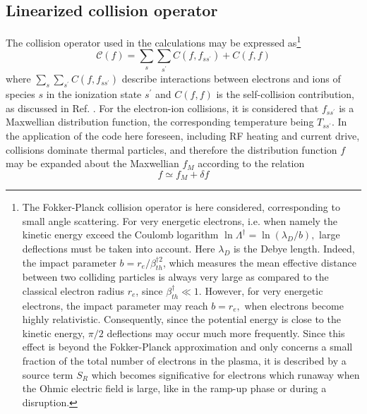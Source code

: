 

\label{Collisions}

\subsection{Linearized collision operator}

The collision operator used in the calculations may be expressed as\footnote{%
The Fokker-Planck collision operator is here considered, corresponding to
small angle scattering. For very energetic electrons, i.e. when namely the
kinetic energy exceed the Coulomb logarithm $\ln \Lambda ^{\dag }=\ln \left(
\lambda _{D}/b\right) ,$ large deflections must be taken into account. Here $%
\lambda _{D}$ is the Debye length. Indeed, the impact parameter $%
b=r_{e}/\beta _{th}^{\dag 2}$, which measures the mean effective distance
between two colliding particles is always very large as compared to the
classical electron radius $r_{e}$, since $\beta _{th}^{\dag }\ll 1.$
However, for very energetic electrons, the impact parameter may reach $%
b=r_{e},$ when electrons become highly relativistic. Consequently, since the
potential energy is close to the kinetic energy, $\pi /2$ deflections may
occur much more frequently. Since this effect is beyond the Fokker-Planck
approximation and only concerns a small fraction of the total number of
electrons in the plasma, it is described by a source term $S_{R}$ which
becomes significative for electrons which runaway when the Ohmic electric
field is large, like in the ramp-up phase or during a disruption.}
\begin{equation}
\mathcal{C}\left( f\right) =\sum_{s}\sum_{s^{\prime }}C\left(
f,f_{ss^{\prime }}\right) +C\left( f,f\right)
\end{equation}
where $\sum_{s}\sum_{s^{\prime }}C\left( f,f_{ss^{\prime }}\right) $
describe interactions between electrons and ions of species $s$ in the
ionization state $s^{\prime }$ and $C\left( f,f\right) $ is the
self-collision contribution, as discussed in Ref. \cite{kar86}. For the
electron-ion collisions, it is considered that $f_{ss^{\prime }}$ is a
Maxwellian distribution function, the corresponding temperature being $%
T_{ss^{\prime }}$. In the application of the code here foreseen, including
RF heating and current drive, collisions dominate thermal particles, and
therefore the distribution function $f$ may be expanded about the Maxwellian
$f_{M}$ according to the relation
\begin{equation}
f\simeq f_{M}+\delta f
\end{equation}

